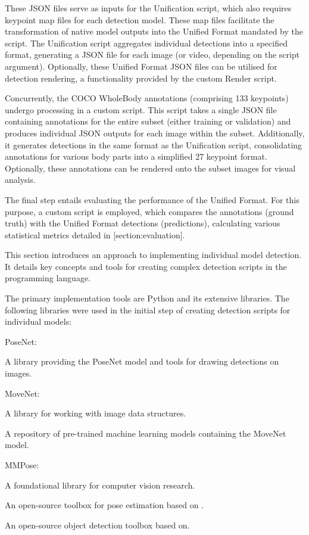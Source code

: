 These JSON files serve as inputs for the Unification script, which also requires keypoint map files for each detection model. These map files facilitate the transformation of native model outputs into the Unified Format mandated by the script. The Unification script aggregates individual detections into a specified format, generating a JSON file for each image (or video, depending on the script argument). Optionally, these Unified Format JSON files can be utilised for detection rendering, a functionality provided by the custom Render script.

Concurrently, the COCO WholeBody annotations (comprising 133 keypoints) undergo processing in a custom script. This script takes a single JSON file containing annotations for the entire subset (either training or validation) and produces individual JSON outputs for each image within the subset. Additionally, it generates detections in the same format as the Unification script, consolidating annotations for various body parts into a simplified 27 keypoint format. Optionally, these annotations can be rendered onto the subset images for visual analysis.

The final step entails evaluating the performance of the Unified Format. For this purpose, a custom script is employed, which compares the annotations (ground truth) with the Unified Format detections (predictions), calculating various statistical metrics detailed in [section:evaluation].

This section introduces an approach to implementing individual model detection. It details key concepts and tools for creating complex detection scripts in the  programming language.

The primary implementation tools are Python and its extensive libraries. The following libraries were used in the initial step of creating detection scripts for individual models:

\startitemize[n]
 \item PoseNet:
 \startitemize[1]
 \item {}\ip A library providing the PoseNet model and tools for drawing detections on images.
 \stopitemize
 \item MoveNet:
 \startitemize[1]
 \item {}\ip A library for working with image data structures.
 \item {}\ip A repository of pre-trained machine learning models containing the MoveNet model.
 \stopitemize
 \item MMPose:
 \startitemize[1]
 \item {}\ip A foundational library for computer vision research.
 \item {}\ip An open-source toolbox for pose estimation based on .
 \item {}\ip An open-source object detection toolbox based on\break {}.
 \stopitemize
\stopitemize

